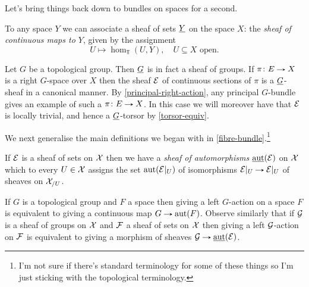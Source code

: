 Let's bring things back down to bundles on spaces for a second.

\begin{definition}
  \label{map-sheaf}
  To any space $Y$ we can associate a sheaf of sets $\underline{Y}$ on the
  space $X$: the \emph{sheaf of continuous maps to $Y$}, given by the
  assignment
  \[
  U \mapsto \hom_\Top(U,Y), \quad U \subseteq X \text{ open}.
  \]
\end{definition}

\begin{example}
  \label{bundle-example}
  Let $G$ be a topological group. Then $\underline{G}$ is in fact a sheaf of
  groups. If $\pi \c E \to X$ is a right $G$-space over $X$ then the
  sheaf $\mathcal{E}$ of continuous sections of $\pi$ is a $\underline{G}$-sheaf in a
  canonical manner. By \cref{principal-right-action}, any principal
  $G$-bundle gives an example of such a $\pi \c E \to X$. In this case
  we will moreover have that $\mathcal{E}$ is locally trivial, and hence a
  $\underline{G}$-torsor by \cref{torsor-equiv}.
\end{example}

We next generalise the main definitions we began with in
\cref{fibre-bundle}.\footnote{I'm not sure if there's standard
  terminology for some of these things so I'm just sticking with the
  topological terminology.}

\begin{definition}
  If $\mathcal{E}$ is a sheaf of sets on $\mathcal{X}$ then we have a \emph{sheaf of
    automorphisms} $\operatorname{\underline{aut}}(\mathcal{E})$ on $\mathcal{X}$ which to every $U \in \mathcal{X}$
  assigns the set $\operatorname{aut}(\mathcal{E}|_U)$ of isomorphisms $\E|_U \to \E|_U$ of
  sheaves on $\mathcal{X}_{/U}$.
\end{definition}

\begin{remark}
  If $G$ is a topological group and $F$ a space then giving a left
  $G$-action on a space $F$ is equivalent to giving a continuous map
  $G \to \aut(F)$. Observe similarly that if $\mathcal{G}$ is a sheaf of groups
  on $\mathcal{X}$ and $\mathcal{F}$ a sheaf of sets on $\mathcal{X}$ then giving a left
  $\mathcal{G}$-action on $\mathcal{F}$ is equivalent to giving a morphism of sheaves
  $\G \to \saut(\E)$.
\end{remark}

